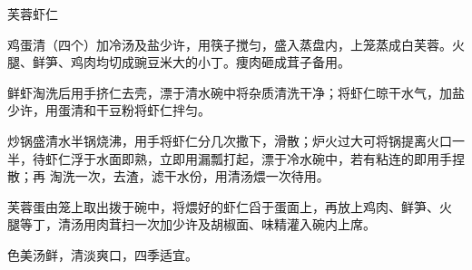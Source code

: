 \begin{recipe}{芙蓉虾仁}

\ingredients


\preparation

\step 鸡蛋清（四个）加冷汤及盐少许，用筷子搅匀，盛入蒸盘内，上笼蒸成白芙蓉。火
腿、鲜笋、鸡肉均切成豌豆米大的小丁。痩肉砸成茸子备用。

\step 鲜虾淘洗后用手挤仁去壳，漂于清水碗中将杂质清洗干净；将虾仁晾干水气，加盐
少许，用蛋清和干豆粉将虾仁拌匀。

\step 炒锅盛清水半锅烧沸，用手将虾仁分几次撒下，滑散；炉火过大可将锅提离火口一
半，待虾仁浮于水面即熟，立即用漏瓢打起，漂于冷水碗中，若有粘连的即用手捏散；再
淘洗一次，去渣，滤干水份，用清汤煨一次待用。

\step 芙蓉蛋由笼上取出拨于碗中，将煨好的虾仁舀于蛋面上，再放上鸡肉、鲜笋、火
腿等丁，清汤用肉茸扫一次加少许及胡椒面、味精灌入碗内上席。

\features

色美汤鲜，清淡爽口，四季适宜。

\end{recipe}

